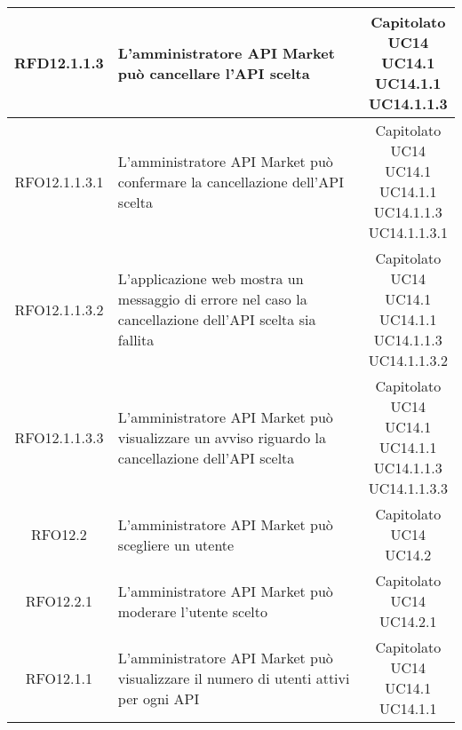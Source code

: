 \begin{longtable}{|c|p{8cm}|c|}
\hypertarget{RFD12.1.1.3}{RFD12.1.1.3} & L'amministratore API Market può cancellare l'API scelta & \makecell*{Capitolato\\UC14\\UC14.1\\UC14.1.1\\UC14.1.1.3} \\
\hline

\hypertarget{RFO12.1.1.3.1}{RFO12.1.1.3.1} & L'amministratore API Market può confermare la cancellazione dell'API scelta & \makecell*{Capitolato\\UC14\\UC14.1\\UC14.1.1\\UC14.1.1.3\\UC14.1.1.3.1} \\
\hline
\hypertarget{RFO12.1.1.3.2}{RFO12.1.1.3.2} & L'applicazione web mostra un messaggio di errore nel caso la cancellazione dell'API scelta sia fallita & \makecell*{Capitolato\\UC14\\UC14.1\\UC14.1.1\\UC14.1.1.3\\UC14.1.1.3.2} \\
\hline
\hypertarget{RFO12.1.1.3.3}{RFO12.1.1.3.3} & L'amministratore API Market può visualizzare un avviso riguardo la cancellazione dell'API scelta & \makecell*{Capitolato\\UC14\\UC14.1\\UC14.1.1\\UC14.1.1.3\\UC14.1.1.3.3} \\
\hline


\hypertarget{RFO12.2}{RFO12.2} & L'amministratore API Market può scegliere un utente & \makecell*{Capitolato\\UC14\\UC14.2} \\
\hline
\hypertarget{RFO12.2.1}{RFO12.2.1} & L'amministratore API Market può moderare l'utente scelto & \makecell*{Capitolato\\UC14\\UC14.2.1} \\
\hline

\hypertarget{RFO12.1.1}{RFO12.1.1} & L'amministratore API Market può visualizzare il numero di utenti attivi per ogni API & \makecell*{Capitolato\\UC14\\UC14.1\\UC14.1.1} \\
\hline


\end{longtable}
